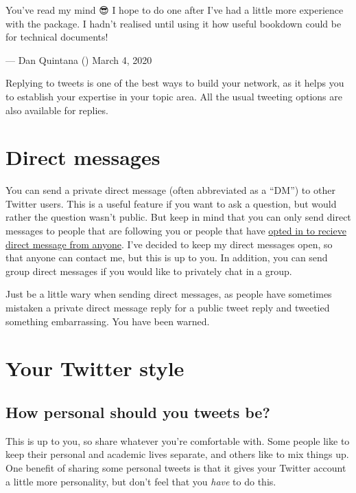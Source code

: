 \documentclass[]{book}
\begin{document}
You've read my mind 😎 I hope to do one after I've had a little more experience with the package. I hadn't realised until using it how useful bookdown could be for technical documents!

--- Dan Quintana (\citet{dsquintana}) March 4, 2020

Replying to tweets is one of the best ways to build your network, as it helps you to establish your expertise in your topic area. All the usual tweeting options are also available for replies.

\hypertarget{direct-messages}{%
\section{Direct messages}\label{direct-messages}}

You can send a private direct message (often abbreviated as a ``DM'') to other Twitter users. This is a useful feature if you want to ask a question, but would rather the question wasn't public. But keep in mind that you can only send direct messages to people that are following you or people that have \href{https://help.twitter.com/en/using-twitter/direct-messages\#receive}{opted in to recieve direct message from anyone}. I've decided to keep my direct messages open, so that anyone can contact me, but this is up to you. In addition, you can send group direct messages if you would like to privately chat in a group.

Just be a little wary when sending direct messages, as people have sometimes mistaken a private direct message reply for a public tweet reply and tweetied something embarrassing. You have been warned.

\hypertarget{your-twitter-style}{%
\section{Your Twitter style}\label{your-twitter-style}}

\hypertarget{how-personal-should-you-tweets-be}{%
\subsection{How personal should you tweets be?}\label{how-personal-should-you-tweets-be}}

This is up to you, so share whatever you're comfortable with. Some people like to keep their personal and academic lives separate, and others like to mix things up. One benefit of sharing some personal tweets is that it gives your Twitter account a little more personality, but don't feel that you \emph{have} to do this.
\end{document}
